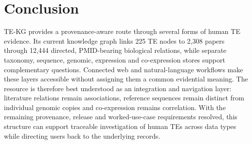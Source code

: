 \section{Conclusion}

TE-KG provides a provenance-aware route through several forms of human TE evidence. Its current knowledge graph links 225 TE nodes to 2,308 papers through 12,444 directed, PMID-bearing biological relations, while separate taxonomy, sequence, genomic, expression and co-expression stores support complementary questions. Connected web and natural-language workflows make these layers accessible without assigning them a common evidential meaning. The resource is therefore best understood as an integration and navigation layer: literature relations remain associations, reference sequences remain distinct from individual genomic copies and co-expression remains correlation. With the remaining provenance, release and worked-use-case requirements resolved, this structure can support traceable investigation of human TEs across data types while directing users back to the underlying records.

